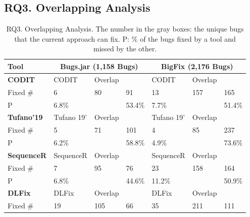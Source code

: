\subsection{\bf RQ3. Overlapping Analysis}
\label{sec:overlap}

{\footnotesize{
\begin{table}[t]
	\caption{RQ3. Overlapping Analysis. The number in the gray boxes: the unique bugs that the current approach can fix. P: \% of the bugs fixed by a tool and missed by the other.}
	\begin{center}
		\renewcommand{\arraystretch}{1}
		\begin{tabular}{p{1cm}<{\centering}|p{1.1cm}<{\centering}|p{0.8cm}<{\centering}|p{0.7cm}<{\centering}|p{1.1cm}<{\centering}|p{0.8cm}<{\centering}|p{0.7cm}<{\centering}}\hline
			Tool &\multicolumn{3}{c|}{Bugs.jar (1,158 Bugs)}&\multicolumn{3}{c}{BigFix (2,176 Bugs)}\\
			\hline
			{\bf CODIT}             & CODIT   & Overlap   & \tool  & CODIT   & Overlap   & {\tool} \\
			\hline
			Fixed \#     & \cellcolor{mygray} 6  & 80   & \cellcolor{mygray} 91  & \cellcolor{mygray} 13 &  157  & \cellcolor{mygray} 165 \\
			P            & 6.8\%   &    & 53.4\%  & 7.7\%   &    & 51.4\% \\
			\hline
			{\bf Tufano'19}             & Tufano 19'   & Overlap   & \tool  & Tufano 19'   & Overlap   & \tool \\
			\hline
			Fixed \#     & \cellcolor{mygray} 5  &  71  & \cellcolor{mygray} 101 & \cellcolor{mygray}4 & 85   & \cellcolor{mygray}237 \\
			P            &  6.2\%  &    &  58.8\% &  4.9\%  &    & 73.6\% \\
			\hline
			{\bf SequenceR}             & SequenceR   & Overlap   & \tool  & SequenceR   & Overlap   & \tool \\
			\hline
			Fixed \#     & \cellcolor{mygray} 7  &   95 & \cellcolor{mygray} 76 & \cellcolor{mygray} 23 &  158  & \cellcolor{mygray} 164 \\
			P            &   6.8\% &    & 44.6\%  &   11.2\% &    & 50.9\% \\
			\hline
			{\bf DLFix} & DLFix   & Overlap   & \tool  & DLFix   & Overlap   & \tool \\
			\hline
			Fixed \#     & \cellcolor{mygray}  19 &  105  & \cellcolor{mygray} 66 & \cellcolor{mygray}35 &  211  & \cellcolor{mygray}111 \\

\end{tabular}
\end{center}
\end{table}}}
